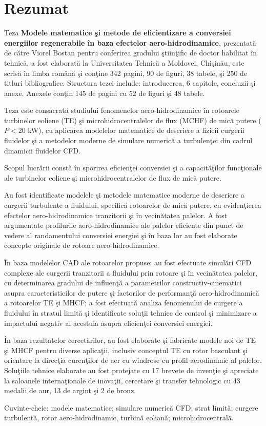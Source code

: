 \section*{Rezumat}

Teza \textbf{Modele matematice şi metode de eficientizare a conversiei energiilor regenerabile
 în baza efectelor aero-hidrodinamice}, prezentată de către Viorel Bostan pentru 
conferirea gradului ştiinţific de doctor habilitat în tehnică, a fost elaborată la Universitatea Tehnică a Moldovei, Chişinău, este scrisă în limba română şi conţine 342 pagini, 90 de figuri, 38 tabele, şi 250 de titluri bibliografice. Structura tezei include: introducerea, 6 capitole, concluzii şi anexe. Anexele conţin 145 de pagini cu 52 de figuri şi 48 tabele.
	
Teza este consacrată studiului fenomenelor aero-hidrodinamice în rotoarele turbinelor eoliene (TE) şi microhidrocentralelor de flux (MCHF) de mică putere ($P<20$ kW), cu aplicarea modelelor matematice de descriere a fizicii curgerii fluidelor şi a metodelor moderne de simulare numerică a turbulenţei din cadrul dinamicii fluidelor CFD.
	
Scopul lucrării constă în sporirea eficienţei conversiei şi a capacităţilor funcţionale ale turbinelor eoliene şi microhidrocentralelor de flux de mică putere.
	
Au fost identificate modelele şi metodele matematice moderne de descriere a curgerii turbulente a fluidului, specifică rotoarelor de mică putere, cu evidenţierea efectelor aero-hidrodinamice tranzitorii şi în vecinătatea palelor. A fost argumentate profilurile aero-hidrodinamice ale palelor eficiente din punct de vedere al randamentului conversiei energiei şi în baza lor au fost elaborate concepte originale de rotoare aero-hidrodinamice.
	
În baza modelelor CAD ale rotoarelor propuse: au fost efectuate simulări CFD complexe ale curgerii tranzitorii a fluidului prin rotoare şi în vecinătatea palelor, cu determinarea gradului de influenţă a parametrilor constructiv-cinematici asupra caracteristicilor de putere şi factorilor de performanţă aero-hidrodinamică a rotoarelor TE şi MHCF; a fost efectuată analiza fenomenului de curgere a fluidului în stratul limită şi identificate soluţii tehnice de control şi minimizare a impactului negativ al acestuia asupra eficienţei conversiei energiei.

În baza rezultatelor cercetărilor, au fost elaborate şi fabricate modele noi de TE şi MHCF pentru diverse aplicaţii, inclusiv conceptul TE cu rotor basculant şi orientare la direcţia curenţilor de aer cu windrose cu profil aerodinamic al palelor. Soluţiile tehnice elaborate au fost protejate cu 17 brevete de invenţie şi apreciate la saloanele internaţionale de inovaţii, cercetare şi transfer tehnologic cu 43 medalii de aur, 13 de argint şi 2 de bronz.

Cuvinte-cheie: modele matematice; simulare numerică CFD; strat limită; curgere turbulentă, rotor aero-hidrodinamic, turbină eoliană; microhidrocentrală.